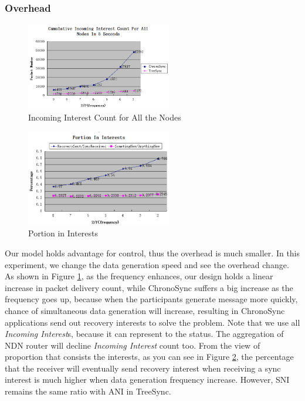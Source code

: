 \documentclass[conference]{IEEEtran}
\begin{document}
\subsubsection{Overhead}
\begin{figure}[!t]
\centering
\includegraphics[width=2.5in]{../png/all-incoming-interest-revised.png}
\caption{Incoming Interest Count for All the Nodes}
\label{overhead}
\end{figure}
\begin{figure}[!t]
\centering
\includegraphics[width=2.5in]{../png/portion-in-interests.png}
\caption{Portion in Interests}
\label{recovery_percentage}
\end{figure}
Our model holds advantage for control,
thus the overhead is much smaller. In this experiment,
we change the data generation speed and see the overhead change.
As shown in Figure \ref{overhead},
as the frequency enhances, our design holds a linear increase in packet delivery count,
while ChronoSync suffers a big increase as the frequency goes up,
because when the participants generate message more quickly,
chance of simultaneous data generation will increase,
resulting in ChronoSync applications send out recovery interests to solve the problem.
Note that we use all \emph{Incoming Interest}s,
because it can represent to the status.
The aggregation of NDN router will decline \emph{Incoming Interest} count too.
From the view of proportion that consists the interests,
as you can see in Figure \ref{recovery_percentage},
the percentage that the receiver will eventually send recovery interest
when receiving a sync interest is much higher when data generation frequency increase.
However, SNI remains the same ratio with ANI in TreeSync.
\end{document}
